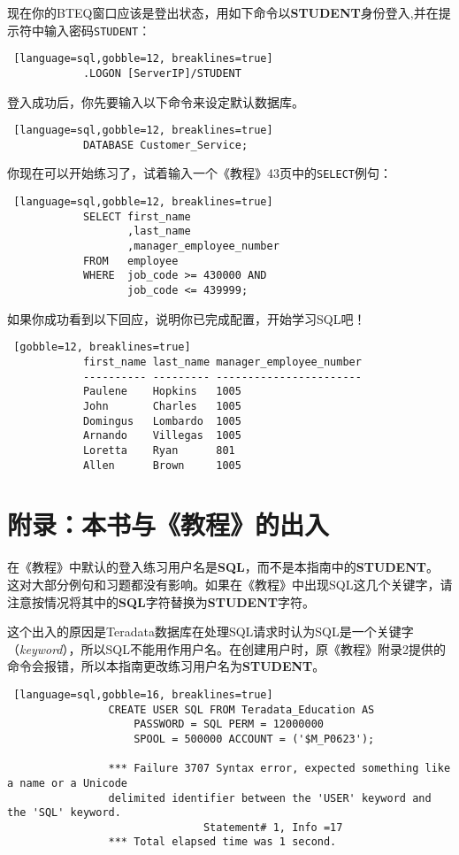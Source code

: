 \documentclass{article}
\begin{document}
		现在你的BTEQ窗口应该是登出状态，用如下命令以\textbf{STUDENT}身份登入,并在提示符中输入密码\lstinline|STUDENT|：

		\begin{lstlisting} [language=sql,gobble=12, breaklines=true]
			.LOGON [ServerIP]/STUDENT
		\end{lstlisting}

		登入成功后，你先要输入以下命令来设定默认数据库。

		\begin{lstlisting} [language=sql,gobble=12, breaklines=true]
			DATABASE Customer_Service;
		\end{lstlisting}

		你现在可以开始练习了，试着输入一个《教程》43页中的\lstinline|SELECT|例句：

		\begin{lstlisting} [language=sql,gobble=12, breaklines=true]
			SELECT first_name
			       ,last_name
			       ,manager_employee_number
			FROM   employee
			WHERE  job_code >= 430000 AND
			       job_code <= 439999;
		\end{lstlisting}

		如果你成功看到以下回应，说明你已完成配置，开始学习SQL吧！

		\begin{lstlisting} [gobble=12, breaklines=true]
			first_name last_name manager_employee_number
			---------- --------- -----------------------
			Paulene    Hopkins   1005
			John       Charles   1005
			Domingus   Lombardo  1005
			Arnando    Villegas  1005
			Loretta    Ryan      801
			Allen      Brown     1005
		\end{lstlisting}

			
		\section*{附录：本书与《教程》的出入}

			在《教程》中默认的登入练习用户名是\textbf{SQL}，而不是本指南中的\textbf{STUDENT}。
			这对大部分例句和习题都没有影响。如果在《教程》中出现SQL这几个关键字，请注意按情况将其中的\textbf{SQL}字符替换为\textbf{STUDENT}字符。

			这个出入的原因是Teradata数据库在处理SQL请求时认为SQL是一个关键字（\textit{keyword}），所以SQL不能用作用户名。在创建用户时，原《教程》附录2提供的命令会报错，所以本指南更改练习用户名为\textbf{STUDENT}。

			\begin{lstlisting} [language=sql,gobble=16, breaklines=true]
				CREATE USER SQL FROM Teradata_Education AS
					PASSWORD = SQL PERM = 12000000
					SPOOL = 500000 ACCOUNT = ('$M_P0623');

				*** Failure 3707 Syntax error, expected something like a name or a Unicode
				delimited identifier between the 'USER' keyword and the 'SQL' keyword.
				               Statement# 1, Info =17
				*** Total elapsed time was 1 second.
			\end{lstlisting}
\end{document}
